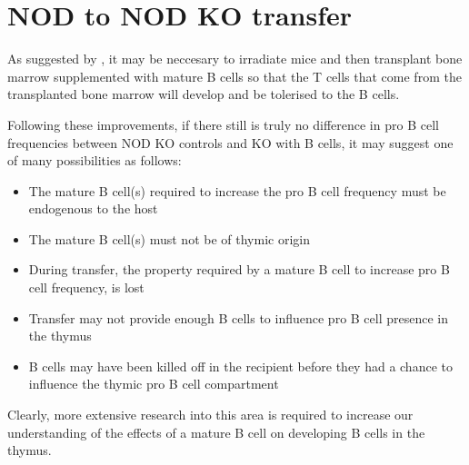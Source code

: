 \section{NOD to NOD KO transfer}
As suggested by \citet{Serreze1998}, it may be neccesary to irradiate mice and then transplant bone marrow supplemented with mature B cells so that the T cells that come from the transplanted bone marrow will develop and be tolerised to the B cells.

Following these improvements, if there still is truly no difference in pro B cell frequencies between NOD KO controls and KO with B cells, it may suggest one of many possibilities as follows:
\begin{itemize}
\item The mature B cell(s) required to increase the pro B cell frequency must be endogenous to the host
\item The mature B cell(s) must not be of thymic origin
\item During transfer, the property required by a mature B cell to increase pro B cell frequency, is lost
\item Transfer may not provide enough B cells to influence pro B cell presence in the thymus
\item B cells may have been killed off in the recipient before they had a chance to influence the thymic pro B cell compartment
\end{itemize}

Clearly, more extensive research into this area is required to increase our understanding of the effects of a mature B cell on developing B cells in the thymus.









